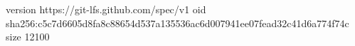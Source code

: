 version https://git-lfs.github.com/spec/v1
oid sha256:c5c7d6605d8fa8c88654d537a135536ac6d007941ee07fead32c41d6a774f74c
size 12100

